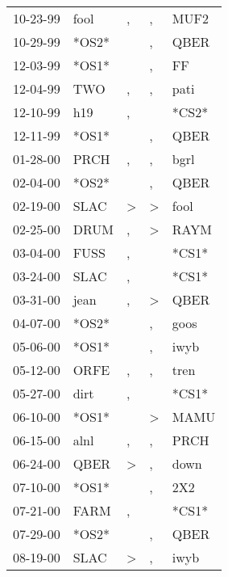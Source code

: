\begin{supertabular}{lllll}
 10-23-99 &   fool &                , &                , &   MUF2 \\
 10-29-99 &  *OS2* &                  &                , &   QBER \\
 12-03-99 &  *OS1* &                  &                , &     FF \\
 12-04-99 &    TWO &                , &                , &   pati \\
 12-10-99 &    h19 &                , &                  &  *CS2* \\
 12-11-99 &  *OS1* &                  &                , &   QBER \\
 01-28-00 &   PRCH &                , &                , &   bgrl \\
 02-04-00 &  *OS2* &                  &                , &   QBER \\
 02-19-00 &   SLAC &     \textgreater &     \textgreater &   fool \\
 02-25-00 &   DRUM &                , &     \textgreater &   RAYM \\
 03-04-00 &   FUSS &                , &                  &  *CS1* \\
 03-24-00 &   SLAC &                , &                  &  *CS1* \\
 03-31-00 &   jean &                , &     \textgreater &   QBER \\
 04-07-00 &  *OS2* &                  &                , &   goos \\
 05-06-00 &  *OS1* &                  &                , &   iwyb \\
 05-12-00 &   ORFE &                , &                , &   tren \\
 05-27-00 &   dirt &                , &                  &  *CS1* \\
 06-10-00 &  *OS1* &                  &     \textgreater &   MAMU \\
 06-15-00 &   alnl &                , &                , &   PRCH \\
 06-24-00 &   QBER &     \textgreater &                , &   down \\
 07-10-00 &  *OS1* &                  &                , &    2X2 \\
 07-21-00 &   FARM &                , &                  &  *CS1* \\
 07-29-00 &  *OS2* &                  &                , &   QBER \\
 08-19-00 &   SLAC &     \textgreater &                , &   iwyb \\

\end{supertabular}
